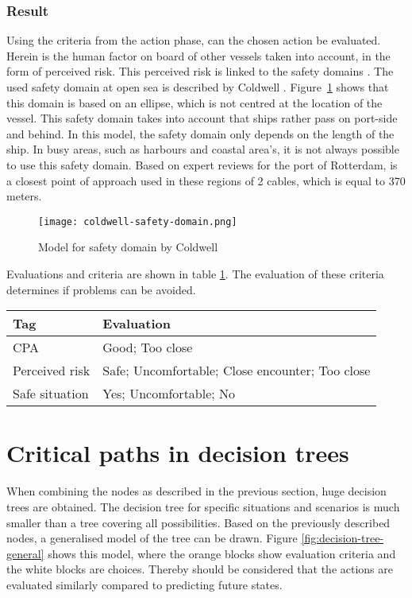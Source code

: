 \subsubsection{Result}
Using the criteria from the action phase, can the chosen action be evaluated. Herein is the human factor on board of other vessels taken into account, in the form of perceived risk. This perceived risk is linked to the safety domains \cite{Szlapczynski2017a}. The used safety domain at open sea is described by Coldwell \cite{Coldwell1983}. Figure~\ref{fig:coldwell-safety-domain} shows that this domain is based on an ellipse, which is not centred at the location of the vessel. This safety domain takes into account that ships rather pass on port-side and behind. In this model, the safety domain only depends on the length of the ship.
In busy areas, such as harbours and coastal area's, it is not always possible to use this safety domain. Based on expert reviews for the port of Rotterdam, is a closest point of approach used in these regions of 2 cables, which is equal to 370 meters.

\begin{figure}[p]
	\centering
	\texttt{[image: coldwell-safety-domain.png]}
	\caption{Model for safety domain by Coldwell}
	\label{fig:coldwell-safety-domain}
\end{figure}

Evaluations and criteria are shown in table \ref{tab:criteria-safe-situation}. The evaluation of these criteria determines if problems can be avoided.

\begin{table}[H]
	\begin{tabular}{p{}|p{}}
		\toprule
		Tag & Evaluation\\
		\midrule
		CPA & Good; Too close\\
		Perceived risk & Safe; Uncomfortable; Close encounter; Too close\\
		Safe situation & Yes; Uncomfortable; No\\
		\bottomrule
	\end{tabular}
	
	\label{tab:criteria-safe-situation}
\end{table}


\section{Critical paths in decision trees}
When combining the nodes as described in the previous section, huge decision trees are obtained. The decision tree for specific situations and scenarios is much smaller than a tree covering all possibilities. Based on the previously described nodes, a generalised model of the tree can be drawn. Figure \ref{fig:decision-tree-general} shows this model, where the orange blocks show evaluation criteria and the white blocks are choices. Thereby should be considered that the actions are evaluated similarly compared to predicting future states.

